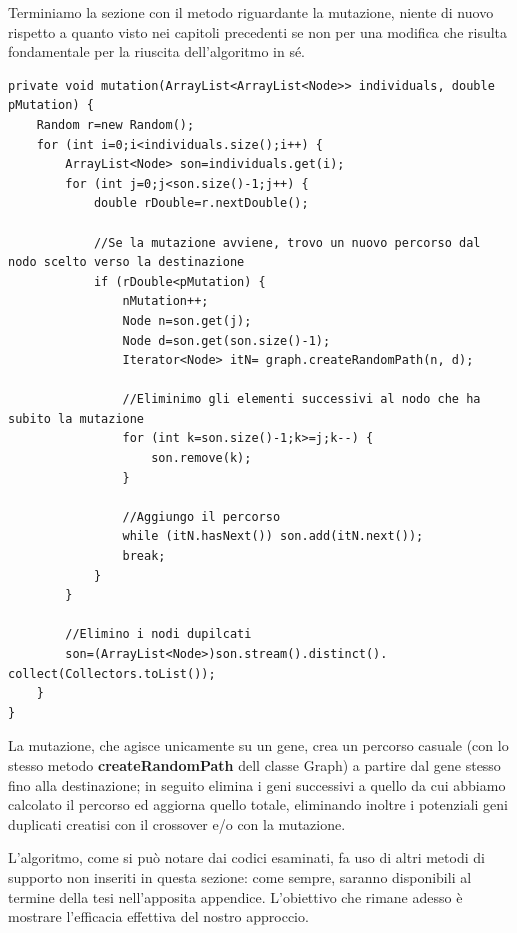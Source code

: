 Terminiamo la sezione con il metodo riguardante la mutazione, niente di nuovo rispetto a quanto visto nei capitoli precedenti se non per una modifica che risulta fondamentale per la riuscita dell'algoritmo in s\'e.
\begin{lstlisting}[style=Java]
private void mutation(ArrayList<ArrayList<Node>> individuals, double pMutation) {
	Random r=new Random();
	for (int i=0;i<individuals.size();i++) {
		ArrayList<Node> son=individuals.get(i);
		for (int j=0;j<son.size()-1;j++) {
			double rDouble=r.nextDouble();
			
			//Se la mutazione avviene, trovo un nuovo percorso dal nodo scelto verso la destinazione
			if (rDouble<pMutation) {
				nMutation++;
				Node n=son.get(j);
				Node d=son.get(son.size()-1);
				Iterator<Node> itN= graph.createRandomPath(n, d);
				
				//Eliminimo gli elementi successivi al nodo che ha subito la mutazione
				for (int k=son.size()-1;k>=j;k--) {
					son.remove(k);
				}
				
				//Aggiungo il percorso
				while (itN.hasNext()) son.add(itN.next());
				break;
			}
		}
		
		//Elimino i nodi dupilcati
		son=(ArrayList<Node>)son.stream().distinct(). collect(Collectors.toList());
	}
}
\end{lstlisting}
La mutazione, che agisce unicamente su un gene, crea un percorso casuale (con lo stesso metodo \textbf{createRandomPath} dell classe Graph) a partire dal gene stesso fino alla destinazione; in seguito elimina i geni successivi a quello da cui abbiamo calcolato il percorso ed aggiorna quello totale, eliminando inoltre i potenziali geni duplicati creatisi con il crossover e/o con la mutazione.
\vspace{3mm}

L'algoritmo, come si pu\`o notare dai codici esaminati, fa uso di altri metodi di supporto non inseriti in questa sezione: come sempre, saranno disponibili al termine della tesi nell'apposita appendice. L'obiettivo che rimane adesso \`e mostrare l'efficacia effettiva del nostro approccio.
